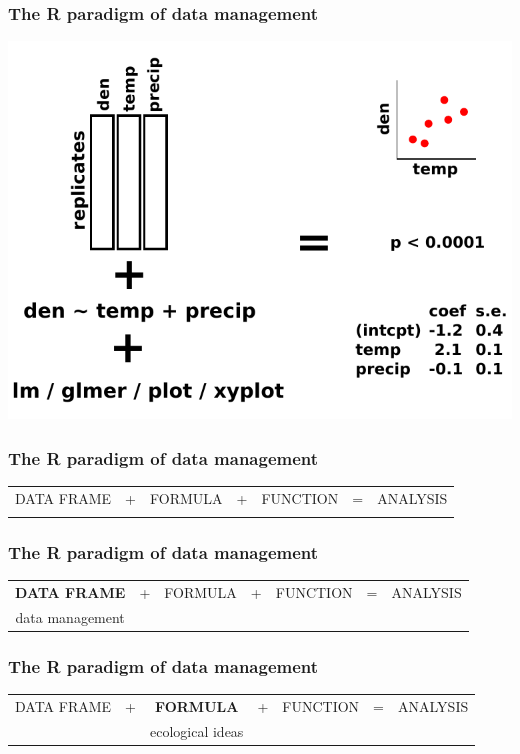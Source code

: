 \documentclass{beamer}
\numberwithin{exercise}{section}
\begin{document}
\begin{frame}
\frametitle{The R paradigm of data management}
\begin{center}
\includegraphics[scale=0.6]{dataframe2function4}
\end{center}
\end{frame}

\setlength{\tabcolsep}{2.5pt}
\begin{frame}
\frametitle{The R paradigm of data management}
\begin{center}
\begin{tabular}{ccccccc}
DATA FRAME&+&FORMULA&+&FUNCTION&=&ANALYSIS \\
\\
\end{tabular}
\end{center}
\end{frame}
\setlength{\tabcolsep}{6pt}

\setlength{\tabcolsep}{2.5pt}
\begin{frame}
\frametitle{The R paradigm of data management}
\begin{center}
\begin{tabular}{ccccccc}
\textbf{DATA FRAME}&+&FORMULA&+&FUNCTION&=&ANALYSIS \\
data management \\
\end{tabular}
\end{center}
\end{frame}
\setlength{\tabcolsep}{6pt}

\setlength{\tabcolsep}{2.5pt}
\begin{frame}
\frametitle{The R paradigm of data management}
\begin{center}
\begin{tabular}{ccccccc}
DATA FRAME&+&\textbf{FORMULA}&+&FUNCTION&=&ANALYSIS \\
&&ecological ideas \\
\end{tabular}
\end{center}
\end{frame}
\setlength{\tabcolsep}{6pt}
\end{document}
